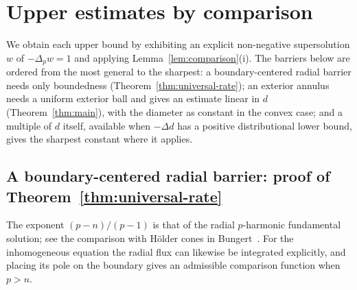 \documentclass[11pt]{article}
\theoremstyle{definition}
\theoremstyle{remark}
\begin{document}
\section{Upper estimates by comparison}\label{sec:upper}
We obtain each upper bound by exhibiting an explicit non-negative
supersolution $w$ of $-\Delta_pw=1$ and applying
Lemma~\ref{lem:comparison}(i). The barriers below are ordered from the most
general to the sharpest: a boundary-centered radial barrier needs only boundedness
(Theorem~\ref{thm:universal-rate}); an exterior annulus needs a uniform
exterior ball and gives an estimate linear in $d$ (Theorem~\ref{thm:main}),
with the diameter as constant in the convex case; and a multiple of $d$
itself, available when $-\Delta d$ has a positive distributional lower bound,
gives the sharpest constant where it applies.

\subsection{A boundary-centered radial barrier: proof of Theorem~\ref{thm:universal-rate}}
\label{subsec:universal-upper}
The exponent $(p-n)/(p-1)$ is that of the radial $p$-harmonic fundamental
solution; see the comparison with H\"older cones in Bungert~\cite{Bun}. For the
inhomogeneous equation the radial flux can likewise be integrated explicitly,
and placing its pole on the boundary gives an admissible comparison function
when $p>n$.
\end{document}
